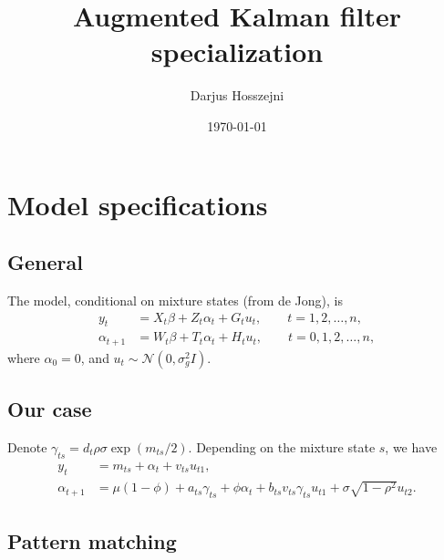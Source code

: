 \documentclass{article}
\title{Augmented Kalman filter specialization}
\author{Darjus Hosszejni}
\date{\today}
\begin{document}
\maketitle

\section{Model specifications}

\subsection{General}

The model, conditional on mixture states (from de Jong), is
\begin{align*}
y_t & = X_t\beta+Z_t\alpha_t+G_tu_t, \qquad t=1,2,\dots,n, \\
\alpha_{t+1} & = W_t\beta+T_t\alpha_t+H_tu_t, \qquad t=0,1,2,\dots,n,
\end{align*}
where $\alpha_0=0$, and $u_t\sim \mathcal{N}(0,\sigma_g^2I)$.

\subsection{Our case}

Denote $\gamma_{ts}=d_t\rho\sigma\exp(m_{ts}/2)$. Depending on the mixture state $s$, we have
\begin{align*}
y_t & = m_{ts}+\alpha_t+v_{ts}u_{t1}, \\
\alpha_{t+1} & = \mu(1-\phi)+a_{ts}\gamma_{ts}+\phi\alpha_t+b_{ts}v_{ts}\gamma_{ts}u_{t1}+\sigma\sqrt{1-\rho^2}u_{t2}.
\end{align*}

\subsection{Pattern matching}
\end{document}
